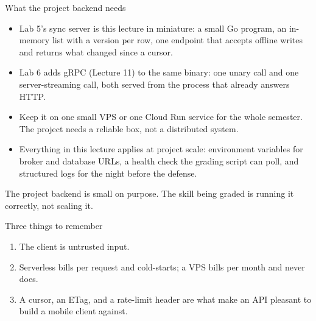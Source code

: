 \documentclass[10pt,aspectratio=169,t]{beamer}
\begin{document}
\begin{frame}[eyebrow=Deploying]{What the project backend needs}
  \vskip 1mm
  \begin{itemize}
    \item Lab 5's sync server is this lecture in miniature: a small Go program, an in-memory list with a version per row, one endpoint that accepts offline writes and returns what changed since a cursor.
    \item Lab 6 adds gRPC (Lecture 11) to the same binary: one unary call and one server-streaming call, both served from the process that already answers HTTP.
    \item Keep it on one small VPS or one Cloud Run service for the whole semester. The project needs a reliable box, not a distributed system.
    \item Everything in this lecture applies at project scale: environment variables for broker and database URLs, a health check the grading script can poll, and structured logs for the night before the defense.
  \end{itemize}
  \begin{takeaway}{The project backend is small on purpose.}
    The skill being graded is running it correctly, not scaling it.
  \end{takeaway}
\end{frame}

\begin{frame}[eyebrow=Recap]{Three things to remember}
  \vskip 2mm
  \begin{enumerate}
    \item The client is untrusted input. 
    \item Serverless bills per request and cold-starts; a VPS bills per month and never does. 
    \item A cursor, an ETag, and a rate-limit header are what make an API pleasant to build a mobile client against. 
  \end{enumerate}
  \vskip 5mm
\end{frame}

\end{document}
